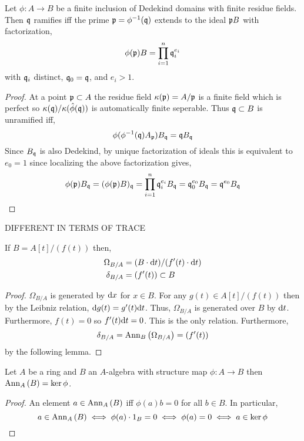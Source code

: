 \documentclass[12pt]{article}
\begin{document}
\begin{proposition}
Let $\phi : A \to B$ be a finite inclusion of Dedekind domains with finite residue fields. Then $\mathfrak{q}$ ramifies iff the prime $\mathfrak{p} = \phi^{-1}(\mathfrak{q})$ extends to the ideal $\mathfrak{p} B$ with factorization,
\[ \phi(\mathfrak{p}) B  = \prod_{i = 1}^{n} \mathfrak{q}_i^{e_i} \]
with $\mathfrak{q}_i$ distinct, $\mathfrak{q}_0 = \mathfrak{q}$, and $e_i > 1$. 
\end{proposition}

\begin{proof}
At a point $\mathfrak{p} \subset A$ the residue field $\kappa(\mathfrak{p}) = A / \mathfrak{p}$ is a finite field which is perfect so $\kappa(\mathfrak{q}) / \kappa(\hat{\phi}(\mathfrak{q}))$ is automatically finite seperable. Thus $\mathfrak{q} \subset B$ is unramified iff,
\[ \phi(\phi^{-1}(\mathfrak{q}) A_{\mathfrak{p}}) B_{\mathfrak{q}} = \mathfrak{q} B_{\mathfrak{q}} \]
Since $B_{\mathfrak{q}}$ is also Dedekind, by unique factorization of ideals this is equivalent to $e_0 = 1$ since localizing the above factorization gives,
\[ \phi(\mathfrak{p}) B_{\mathfrak{q}} = (\phi(\mathfrak{p}) B)_{\mathfrak{q}} = \prod_{i = 1}^{n} \mathfrak{q}_i^{e_i} B_{\mathfrak{q}} = \mathfrak{q}_0^{e_0} B_{\mathfrak{q}} = \mathfrak{q}^{e_0} B_{\mathfrak{q}} \]
\end{proof}

\begin{proposition}
DIFFERENT IN TERMS OF TRACE
\end{proposition}

\begin{lemma}
If $B = A[t]/(f(t))$ then,
\begin{align*}
\Omega_{B / A} & = (B \cdot \mathrm{d}{t}) /(f'(t) \cdot \mathrm{d}{t})
\\
\delta_{B / A} & = (f'(t)) \subset B
\end{align*}
\end{lemma}

\begin{proof}
$\Omega_{B / A}$ is generated by $\mathrm{d}{x}$ for $x \in B$. For any $g(t) \in A[t]/(f(t))$ then by the Leibniz relation, $\mathrm{d}{g(t)} = g'(t) \mathrm{d}{t}$. Thus, $\Omega_{B / A}$ is generated over $B$ by $\mathrm{d}{t}$. Furthermore, $f(t) = 0$ so $f'(t) \mathrm{d}{t} = 0$. This is the only relation. Furthermore,
\[ \delta_{B / A} = \mathrm{Ann}_{B}\left(\Omega_{B/A}\right) = (f'(t)) \]
by the following lemma.
\end{proof}

\begin{lemma}
Let $A$ be a ring and $B$ an $A$-algebra with structure map $\phi : A \to B$ then $\mathrm{Ann}_{A}\left(B\right) = \ker{\phi}$. 
\end{lemma}

\begin{proof}
An element $a \in \mathrm{Ann}_{A}\left(B\right)$ iff $\phi(a)b = 0$ for all $b \in B$. In particular,
\[ a \in \mathrm{Ann}_{A}\left(B\right) \iff \phi(a) \cdot 1_B = 0 \iff \phi(a) = 0 \iff a \in \ker{\phi} \]
\end{proof}
\newcommand{\ints}[1]{\mathcal{O}_{#1}}
\end{document}

